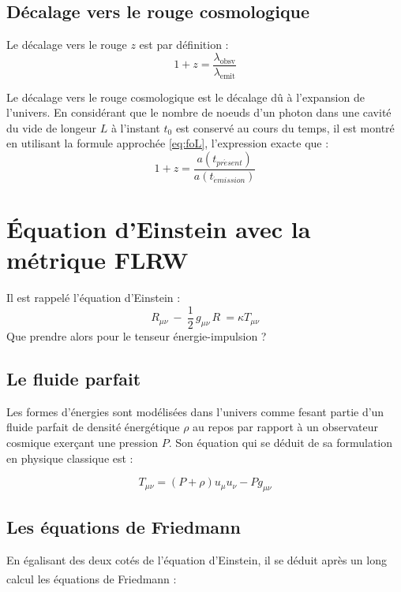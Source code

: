 \documentclass[10pt, a4paper]{report}
\numberwithin{equation}{subsection}
\begin{document}
\subsection{Décalage vers le rouge cosmologique}
Le décalage vers le rouge $z$ est par définition : 
\begin{equation}
\boxed{1+z = \frac{\lambda_{\mathrm{obsv}}}{\lambda_{\mathrm{emit}}}}
\end{equation}

Le décalage vers le rouge cosmologique est le décalage dû à l'expansion de l'univers. En considérant que le nombre de noeuds d'un photon dans une cavité du vide de longeur $L$ à l'instant $t_0$ est conservé au cours du temps, il est montré en utilisant la formule approchée \ref{eq:foL}, l'expression exacte que :
\begin{equation} \label{eq:zC}
\boxed{1+z = \frac{a(t_{pr\acute esent})}{a(t_{\acute emission})}}
\end{equation}

\section{\uppercase{é}quation d'Einstein avec la métrique FLRW}
Il est rappelé l'équation d'Einstein :
\begin{equation} \label{eq:EFE}
\boxed{R_{\mu \nu} \ - \ \frac{1}{2} \, g_{\mu \nu} \, R  \  =  \kappa T_{\mu \nu}}
\end{equation}
Que prendre alors pour le tenseur énergie-impulsion ?
\subsection{Le fluide parfait}
Les formes d'énergies sont modélisées dans l'univers comme fesant partie d'un fluide parfait de densité énergétique $\rho$ au repos par rapport à un observateur cosmique exerçant une pression $P$. Son équation qui se déduit de sa formulation en physique classique est : 

\begin{equation} \label{eq:FP}
\boxed{T_{\mu\nu} = (P + \rho) u_\mu u_\nu - P g_{\mu\nu}}
\end{equation}

\subsection{Les équations de Friedmann}
En égalisant des deux cotés de l'équation d'Einstein, il se déduit après un long calcul\textsuperscript{\cite{cours_RG1}} les équations de Friedmann :
\end{document}
